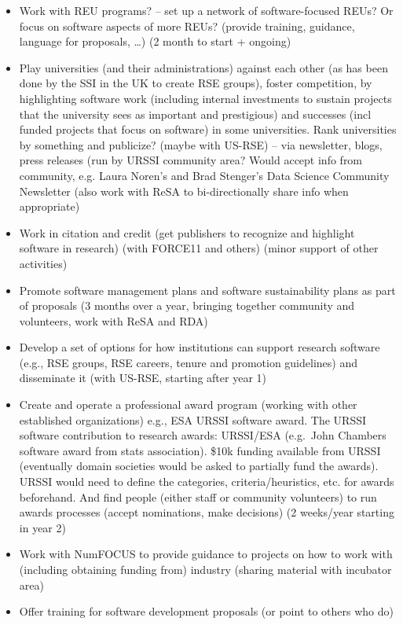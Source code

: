 \documentclass[
]{book}
\begin{document}
\begin{itemize}
\item
  Work with REU programs? -- set up a network of software-focused REUs? Or focus on software
  aspects of more REUs? (provide training, guidance, language for proposals, \ldots)
  (2 month to start + ongoing)
\item
  Play universities (and their administrations) against each other (as has been done by
  the SSI in the UK to create RSE groups), foster competition, by highlighting software work
  (including internal investments to sustain projects that the university sees as important
  and prestigious) and successes (incl funded projects that focus on software) in some universities.
  Rank universities by something and publicize? (maybe with US-RSE) -- via newsletter, blogs,
  press releases (run by URSSI community area? Would accept info from community, e.g.
  Laura Noren's and Brad Stenger's Data Science Community Newsletter (also work with ReSA
  to bi-directionally share info when appropriate)
\item
  Work in citation and credit (get publishers to recognize and highlight software in
  research) (with FORCE11 and others) (minor support of other activities)
\item
  Promote software management plans and software sustainability plans as part of proposals
  (3 months over a year, bringing together community and volunteers, work with ReSA and RDA)
\item
  Develop a set of options for how institutions can support research software (e.g., RSE groups,
  RSE careers, tenure and promotion guidelines) and disseminate it (with US-RSE, starting after year 1)
\item
  Create and operate a professional award program (working with other established organizations)
  e.g., ESA URSSI software award. The URSSI software contribution to research awards: URSSI/ESA
  (e.g.~John Chambers software award from stats association). \$10k funding available from URSSI
  (eventually domain societies would be asked to partially fund the awards). URSSI would need to
  define the categories, criteria/heuristics, etc. for awards beforehand. And find people
  (either staff or community volunteers) to run awards processes (accept nominations, make decisions)
  (2 weeks/year starting in year 2)
\item
  Work with NumFOCUS to provide guidance to projects on how to work with (including obtaining
  funding from) industry (sharing material with incubator area)
\item
  Offer training for software development proposals (or point to others who do)


\end{itemize}
\end{document}
